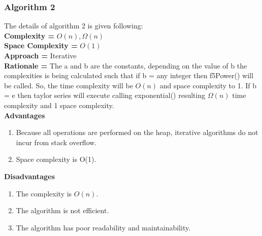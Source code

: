 \documentclass[a4paper,12pt]{article}
\begin{document}
        \subsubsection{Algorithm 2}
    The details of algorithm 2 is given following:
    \\\textbf{ Complexity = } $O(n), \Omega(n)$
    \\\textbf{Space Complexity = } $O(1)$
    \\\textbf{Approach = } Iterative
    \\\textbf{Rationale = } The a and b are the constants, depending on the value of b the complexities is being calculated such that if b = any integer then f5Power() will be called. So, the time complexity will be $O(n)$ and space complexity to 1. If b = e then taylor series will execute calling exponential() resulting $\Omega(n)$ time complexity and 1 space complexity.
    \\\textbf{Advantages}
    \begin{enumerate}
        \item Because all operations are performed on the heap, iterative algorithms do not incur from stack overflow.
        \item Space complexity is O(1).
    \end{enumerate}
    \textbf{Disadvantages}
    \begin{enumerate}
        \item The complexity is $O(n)$.
        \item The algorithm is not efficient.
        \item The algorithm has poor readability and maintainability.
    \end{enumerate}
    
\end{document}
